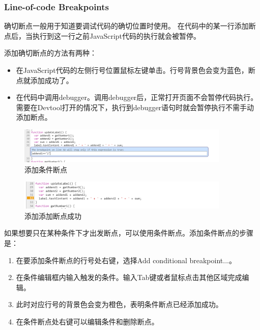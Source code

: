 \subsubsection{Line-of-code Breakpoints}
确切断点一般用于知道要调试代码的确切位置时使用。
在代码中的某一行添加断点后，当执行到这一行之前JavaScript代码的执行就会被暂停。

添加确切断点的方法有两种：
\begin{itemize}
\item 在JavaScript代码的左侧行号位置鼠标左键单击。行号背景色会变为蓝色，断点就添加成功了。
\item 在代码中调用debugger。调用debugger后，正常打开页面不会暂停代码执行。
需要在Devtool打开的情况下，执行到debugger语句时就会暂停执行不需手动添加断点。
\end{itemize}

\begin{figure}[H] 
\centering 
\includegraphics[width=0.9\textwidth]{image/devtools_study/add_conditional_breakpoint1.png} 
\caption{添加条件断点} \label{fig:sources_panel} 
\end{figure}

\begin{figure}[H] 
\centering 
\includegraphics[width=0.9\textwidth]{image/devtools_study/add_conditional_breakpoint2.png} 
\caption{添加添加断点成功} \label{fig:sources_panel} 
\end{figure}

如果想要只在某种条件下才出发断点，可以使用条件断点。添加条件断点的步骤是：
\begin{enumerate}
\item 在要添加条件断点的行号处右键，选择Add conditional breakpoint...。
\item 在条件编辑框内输入触发的条件。输入Tab键或者鼠标点击其他区域完成编辑。
\item 此时对应行号的背景色会变为橙色，表明条件断点已经添加成功。
\item 在条件断点处右键可以编辑条件和删除断点。
\end{enumerate}

